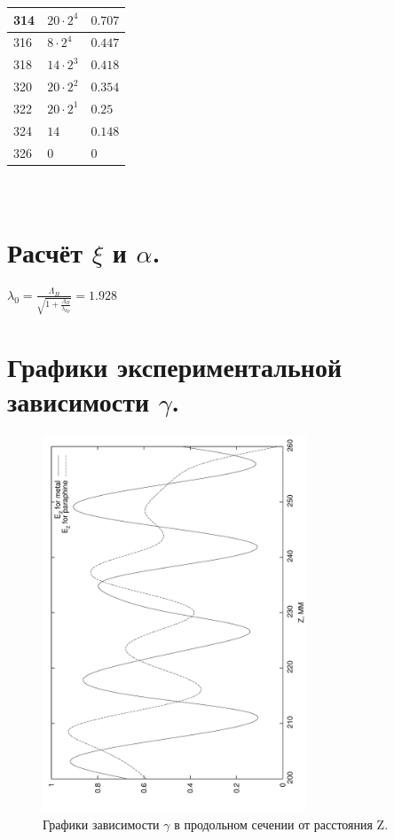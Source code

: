 \documentclass[a4paper, titlepage, 10pt]{article}
\begin{document}
\begin{minipage}{0.4\textwidth}
\begin{center}
\begin{tabular}{|l|l|l|}
  \hline
  314 & \( 20 \cdot 2^4 \) & \( 0.707 \) \\
  \hline
  316 & \( 8 \cdot 2^4 \) & \( 0.447 \) \\
  \hline
  318 & \( 14 \cdot 2^3 \) & \( 0.418 \) \\
  \hline
  320 & \( 20 \cdot 2^2 \) & \( 0.354 \) \\
  \hline
  322 & \( 20 \cdot 2^1 \) & \( 0.25 \) \\
  \hline
  324 & \( 14 \) & \( 0.148 \) \\
  \hline
  326 & \( 0 \) & \( 0 \) \\
  \hline
 \end{tabular}
\end{center}
\end{minipage}

\appendix
\section*{\\[1cm]Расчёт \( \xi\) и \(  \alpha \).}
\( \lambda_{0} = \frac{\Lambda_B}{\sqrt{1 + \frac{\Lambda_B}{\lambda_{kp}}} } = 1.928\)


\appendix
\section*{Графики экспериментальной зависимости \( \gamma \).}

\begin{figure}[h!]
 \centering
 \includegraphics[angle = 270,width=0.7\textwidth]{Ez}
 \caption{Графики зависимости \( \gamma \) в продольном сечении от расстояния Z.}
\end{figure}
\end{document}
